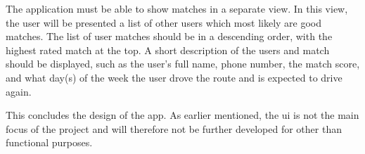 The application must be able to show matches in a separate view.
In this view, the user will be presented a list of other users which most likely are good matches. 
The list of user matches should be in a descending order, with the highest rated match at the top.
A short description of the users and match should be displayed, such as the user's full name, phone number, the match score, and what day(s) of the week the user drove the route and is expected to drive again.

This concludes the design of the app.
As earlier mentioned, the \gls{ui} is not the main focus of the project and will therefore not be further developed for other than functional purposes.

